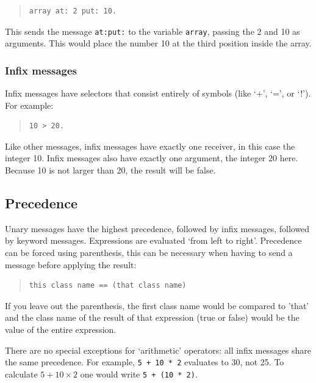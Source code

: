 \documentclass[a4paper]{article}
\begin{document}
\begin{quote}
\begin{lstlisting}
array at: 2 put: 10.
\end{lstlisting}
\end{quote}

This sends the message \texttt{at:put:} to the variable \texttt{array}, passing the 2 and 10 as arguments. This would place the number 10 at the third position inside the array.



\subsubsection{Infix messages}

Infix messages have selectors that consist entirely of symbols (like `+', `=', or `!'). For example:

\begin{quote}
\begin{lstlisting}
10 > 20.
\end{lstlisting}
\end{quote}

Like other messages, infix messages have exactly one receiver, in this case the integer 10.
Infix messages also have exactly one argument, the integer 20 here.
Because 10 is not larger than 20, the result will be false.

\subsection{Precedence}

Unary messages have the highest precedence, followed by infix messages, followed by keyword messages. Expressions are evaluated `from left to right'. Precedence can be forced using parenthesis, this can be necessary when having to send a message before applying the result:
\begin{quote}
\begin{lstlisting}
this class name == (that class name)
\end{lstlisting}
\end{quote}
If you leave out the parenthesis, the first class name would be compared to 'that' and the class name of the result of that expression (true or false) would be the value of the entire expression.

There are no special exceptions for `arithmetic' operators: all infix messages share the same precedence.
For example, \texttt{5 + 10 * 2} evaluates to 30, not 25.
To calculate $5 + 10 \times 2$ one would write \texttt{5 + (10 * 2)}.
\end{document}
